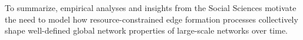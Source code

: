 To summarize, empirical analyses and insights from the Social Sciences motivate
the need to model how resource-constrained edge formation processes collectively
shape well-defined global network properties of large-scale networks over time.





